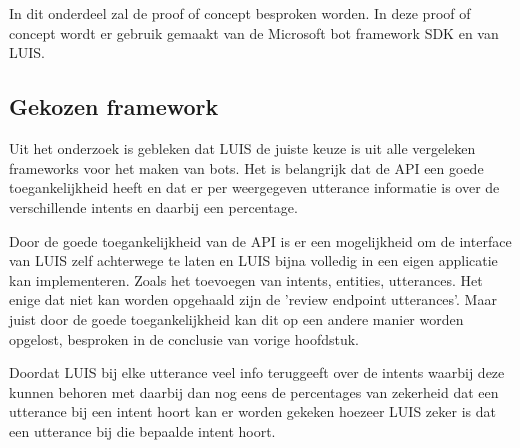 


\chapter{}
\label{ch:poc}

In dit onderdeel zal de proof of concept besproken worden. In deze proof of concept wordt er gebruik gemaakt van de Microsoft bot framework SDK en van LUIS.

\section{Gekozen framework}
\label{sec:framework}

Uit het onderzoek is gebleken dat LUIS de juiste keuze is uit alle vergeleken frameworks voor het maken van bots. Het is belangrijk dat de API een goede toegankelijkheid heeft en dat er per weergegeven utterance informatie is over de verschillende intents en daarbij een percentage.

Door de goede toegankelijkheid van de API is er een mogelijkheid om de interface van LUIS zelf achterwege te laten en LUIS bijna volledig in een eigen applicatie kan implementeren. Zoals het toevoegen van intents, entities, utterances. Het enige dat niet kan worden opgehaald zijn de 'review endpoint utterances'. Maar juist door de goede toegankelijkheid kan dit op een andere manier worden opgelost, besproken in de conclusie van vorige hoofdstuk.

Doordat LUIS bij elke utterance veel info teruggeeft over de intents waarbij deze kunnen behoren met daarbij dan nog eens de percentages van zekerheid dat een utterance bij een intent hoort kan er worden gekeken hoezeer LUIS zeker is dat een utterance bij die bepaalde intent hoort.

